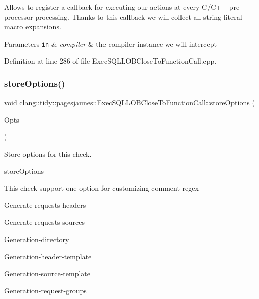 Allows to register a callback for executing our actions at every C/\+C++ pre-\/processor processing. Thanks to this callback we will collect all string literal macro expansions.


\begin{DoxyParams}[1]{Parameters}
\mbox{\tt in}  & {\em compiler} & the compiler instance we will intercept \\
\hline
\end{DoxyParams}


Definition at line 286 of file Exec\+S\+Q\+L\+L\+O\+B\+Close\+To\+Function\+Call.\+cpp.

\mbox{\label{classclang_1_1tidy_1_1pagesjaunes_1_1_exec_s_q_l_l_o_b_close_to_function_call_a2a8af72b74ea427236ed0660f8b595ff}} 
\subsubsection{\texorpdfstring{store\+Options()}{storeOptions()}}
{\footnotesize\ttfamily void clang\+::tidy\+::pagesjaunes\+::\+Exec\+S\+Q\+L\+L\+O\+B\+Close\+To\+Function\+Call\+::store\+Options (\begin{DoxyParamCaption}\item[{Clang\+Tidy\+Options\+::\+Option\+Map \&}]{Opts }\end{DoxyParamCaption})\hspace{0.3cm}{\ttfamily [override]}}



Store options for this check. 

store\+Options

This check support one option for customizing comment regex
\begin{DoxyItemize}
\item Generate-\/requests-\/headers
\item Generate-\/requests-\/sources
\item Generation-\/directory
\item Generation-\/header-\/template
\item Generation-\/source-\/template
\item Generation-\/request-\/groups
\end{DoxyItemize}



